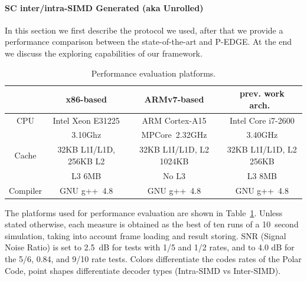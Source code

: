\paragraph{SC inter/intra-SIMD Generated (aka Unrolled)}

In this section we first describe the protocol we used, after that we provide a
performance comparison between the state-of-the-art and P-EDGE. At the end we
discuss the exploring capabilities of our framework.

\begin{table}
  \begin{center}
  \begin{tabular}{c|c|c|c}
           & x86-based              & ARMv7-based             & prev. work arch.~\cite{Sarkis2014}\\
  \hline
  CPU      & Intel Xeon E31225      & ARM Cortex-A15          & Intel Core i7-2600                \\
           & 3.10Ghz                & MPCore~2.32GHz          & 3.40GHz                           \\
  Cache    & 32KB L1I/L1D, 256KB L2 & 32KB L1I/L1D, L2 1024KB & 32KB L1I/L1D, L2 256KB            \\
           & L3 6MB                 & No L3                   & L3 8MB                            \\
  Compiler & GNU g++~4.8            & GNU g++~4.8             & GNU g++~4.8                       \\
  \hline
  \end{tabular}
  \end{center}
  \caption{Performance evaluation platforms.}
  \label{tab:polar_sc_gen_thr_specs}
\end{table}

The platforms used for performance evaluation are shown in
Table~\ref{tab:polar_sc_gen_thr_specs}. Unless stated otherwise, each measure is
obtained as the best of ten runs of a 10~second simulation, taking into account
frame loading and result storing. SNR (Signal Noise Ratio) is set to 2.5~dB for
tests with 1/5 and 1/2 rates, and to 4.0 dB for the 5/6, 0.84, and 9/10 rate
tests. Colors differentiate the codes rates of the Polar Code, point shapes
differentiate decoder types (Intra-SIMD vs Inter-SIMD).

